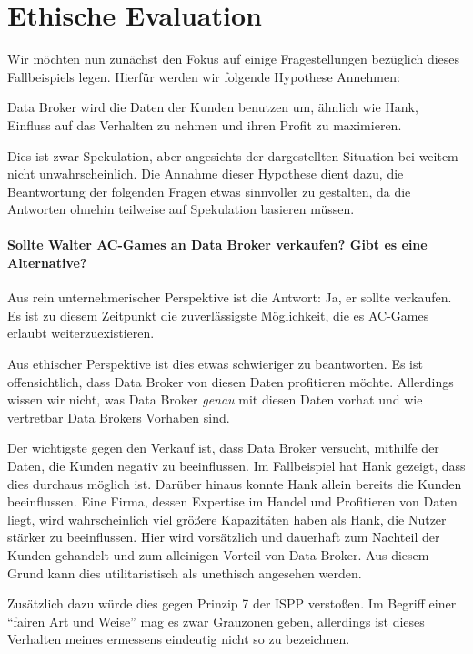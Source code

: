 \section{Ethische Evaluation}

Wir möchten nun zunächst den Fokus auf einige Fragestellungen bezüglich dieses Fallbeispiels legen. Hierfür werden wir folgende Hypothese Annehmen:

\begin{center}
\parbox{0.8\textwidth}{
    Data Broker wird die Daten der Kunden benutzen um, ähnlich wie Hank, Einfluss auf das Verhalten zu nehmen und ihren Profit zu maximieren. 
}
\end{center}

Dies ist zwar Spekulation, aber angesichts der dargestellten Situation bei weitem nicht unwahrscheinlich.
Die Annahme dieser Hypothese dient dazu, die Beantwortung der folgenden Fragen etwas sinnvoller zu gestalten, da die Antworten ohnehin teilweise auf Spekulation basieren müssen.

\paragraph*{Sollte Walter AC-Games an Data Broker verkaufen?\cite{kees_faites_2017} Gibt es eine Alternative?}

Aus rein unternehmerischer Perspektive ist die Antwort: Ja, er sollte verkaufen.
Es ist zu diesem Zeitpunkt die zuverlässigste Möglichkeit, die es AC-Games erlaubt weiterzuexistieren.

Aus ethischer Perspektive ist dies etwas schwieriger zu beantworten.
Es ist offensichtlich, dass Data Broker von diesen Daten profitieren möchte.
Allerdings wissen wir nicht, was Data Broker \emph{genau} mit diesen Daten vorhat und wie vertretbar Data Brokers Vorhaben sind.

Der wichtigste gegen den Verkauf ist, dass Data Broker versucht, mithilfe der Daten, die Kunden negativ zu beeinflussen. 
Im Fallbeispiel hat Hank gezeigt, dass dies durchaus möglich ist.
Darüber hinaus konnte Hank allein bereits die Kunden beeinflussen.
Eine Firma, dessen Expertise im Handel und Profitieren von Daten liegt, wird wahrscheinlich viel größere Kapazitäten haben als Hank, die Nutzer stärker zu beeinflussen.
Hier wird vorsätzlich und dauerhaft zum Nachteil der Kunden gehandelt und zum alleinigen Vorteil von Data Broker. Aus diesem Grund kann dies utilitaristisch als unethisch angesehen werden.

Zusätzlich dazu würde dies gegen Prinzip 7 der ISPP verstoßen. Im Begriff einer \enquote{fairen Art und Weise} mag es zwar Grauzonen geben, allerdings ist dieses Verhalten meines ermessens eindeutig nicht so zu bezeichnen.  


